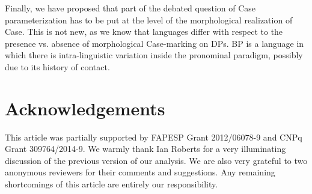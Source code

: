 \documentclass[output=paper]{langsci/langscibook}
\begin{document}
Finally, we have proposed that part of the debated question of Case
parameterization has to be put at the level of the morphological realization of
Case. This is not new, as we know that languages differ with respect to the
presence vs. absence of morphological Case-marking on DPs.  BP is a language in
which there is intra-linguistic variation inside the pronominal paradigm,
possibly due to its history of contact.

\printchapterglossary{}

\section*{Acknowledgements}

This article was partially supported by FAPESP Grant 2012/06078-9 and CNPq
Grant 309764/2014-9. We warmly thank Ian Roberts for a very illuminating
discussion of the previous version of our analysis. We are also very grateful
to two anonymous reviewers for their comments and suggestions. Any remaining
shortcomings of this article are entirely our responsibility.

{\sloppy\printbibliography[heading=subbibliography,notkeyword=this]}
\end{document}
